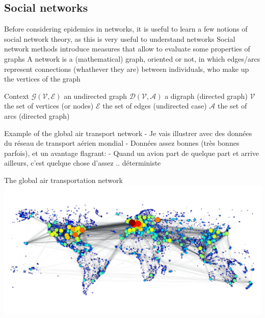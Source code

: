 \documentclass[aspectratio=43]{beamer}
\begin{document}
\subsection{Social networks}

\begin{frame}
Before considering epidemics in networks, it is useful to learn a few notions of social network theory, as this is very useful to understand networks
\vfill
Social network methods introduce measures that allow to evaluate some properties of graphs
\vfill
A network is a (mathematical) graph, oriented or not, in which edges/arcs represent connections (whathever they are) between individuals, who make up the vertices of the graph
\end{frame}



\begin{frame}{Context}
\bbullet $\mathcal{G}(\mathcal{V},\mathcal{E})$ an undirected graph
\vfill
\bbullet $\mathcal{D}(\mathcal{V},\mathcal{A})$ a digraph (directed graph)
\vfill
\bbullet $\mathcal{V}$ the set of vertices (or nodes)
\vfill
\bbullet $\mathcal{E}$ the set of edges (undirected case)
\vfill
\bbullet $\mathcal{A}$ the set of arcs (directed graph)
\end{frame}


\begin{frame}{Example of the global air transport network}
- Je vais illustrer avec des données du réseau de transport aérien mondial
- Données assez bonnes (très bonnes parfois), et un avantage flagrant:
  - Quand un avion part de quelque part et arrive ailleurs, c'est quelque chose d'assez .. déterministe
\end{frame}


\begin{frame}{The global air transportation network}
	\bigskip
	{\centering
		\hspace*{-\beamerleftmargin}
		\includegraphics[width=\paperwidth]{FIGS/world_graph-degree}
	}
\end{frame}
\end{document}
